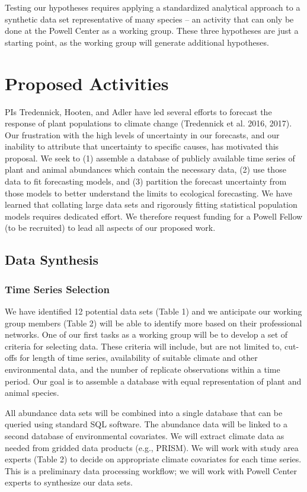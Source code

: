 \documentclass[12pt,]{article}
\begin{document}
Testing our hypotheses requires applying a standardized analytical
approach to a synthetic data set representative of many species -- an
activity that can only be done at the Powell Center as a working group.
These three hypotheses are just a starting point, as the working group
will generate additional hypotheses.

\section{Proposed Activities}

PIs Tredennick, Hooten, and Adler have led several efforts to forecast
the response of plant populations to climate change (Tredennick et al.
2016, 2017). Our frustration with the high levels of uncertainty in our
forecasts, and our inability to attribute that uncertainty to specific
causes, has motivated this proposal. We seek to (1) assemble a database
of publicly available time series of plant and animal abundances which
contain the necessary data, (2) use those data to fit forecasting
models, and (3) partition the forecast uncertainty from those models to
better understand the limits to ecological forecasting. We have learned
that collating large data sets and rigorously fitting statistical
population models requires dedicated effort. We therefore request
funding for a Powell Fellow (to be recruited) to lead all aspects of our
proposed work.

\subsection{Data Synthesis}\subsubsection{Time Series Selection}

We have identified 12 potential data sets (Table 1) and we anticipate
our working group members (Table 2) will be able to identify more based
on their professional networks. One of our first tasks as a working
group will be to develop a set of criteria for selecting data. These
criteria will include, but are not limited to, cut-offs for length of
time series, availability of suitable climate and other environmental
data, and the number of replicate observations within a time period. Our
goal is to assemble a database with equal representation of plant and
animal species.

All abundance data sets will be combined into a single database that can
be queried using standard SQL software. The abundance data will be
linked to a second database of environmental covariates. We will extract
climate data as needed from gridded data products (e.g., PRISM). We will
work with study area experts (Table 2) to decide on appropriate climate
covariates for each time series. This is a preliminary data processing
workflow; we will work with Powell Center experts to synthesize our data
sets.
\end{document}
